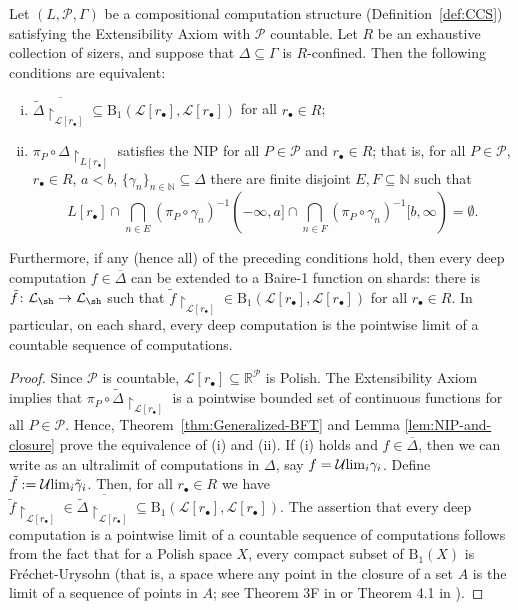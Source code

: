 \begin{theorem}\label{thm:nip-baire1def}
    Let $(L,\mathcal{P},\Gamma)$ be a compositional computation structure (Definition~\ref{def:CCS}) satisfying the Extensibility Axiom with $\mathcal{P}$ countable.
    Let $R$ be an exhaustive collection of sizers, and suppose that $\Delta\subseteq\Gamma$ is $R$-confined.
    Then the following conditions are equivalent:

    \begin{enumerate}[(i)]
        \item $\overline{\tilde\Delta\restriction_{\mathcal{L}[r_\bullet]}}\subseteq \mathrm{B}_1(\mathcal{L}[r_\bullet],\mathcal{L}[r_\bullet])$ for all $r_\bullet\in R$;
        \item $\pi_P\circ \Delta\restriction_{L[r_\bullet]}$ satisfies the NIP for all $P\in\mathcal{P}$ and $r_\bullet\in R$; that is, for all $P\in\mathcal{P}$, $r_\bullet\in R$, $a<b$, $\{\gamma_n\}_{n\in\mathbb{N}}\subseteq\Delta$ there are finite disjoint $E,F\subseteq\mathbb{N}$ such that
        \[L[r_\bullet]\cap\bigcap_{n\in E}(\pi_P\circ\gamma_n)^{-1}(-\infty,a]\cap\bigcap_{n\in F}(\pi_P\circ\gamma_n)^{-1}[b,\infty)=\emptyset.\]
    \end{enumerate}

    Furthermore, if any (hence all) of the preceding conditions hold, then every deep computation $f\in\overline{\Delta}$ can be extended to a Baire-1 function on shards: there is $\tilde f\colon\mathcal{L}_{\sh}\to \mathcal{L}_{\sh}$ such that $\tilde f\restriction_{\mathcal{L}[r_\bullet]}\in \mathrm{B}_1(\mathcal{L}[r_\bullet],\mathcal{L}[r_\bullet])$ for all $r_{\bullet}\in R$.
    In particular, on each shard, every deep computation is the pointwise limit of a countable sequence of computations.
\end{theorem}

\begin{proof}
    Since $\mathcal{P}$ is countable, $\mathcal{L}[r_\bullet]\subseteq\mathbb{R}^\mathcal{P}$ is Polish.
    The Extensibility Axiom implies that $\pi_P\circ \tilde\Delta\restriction_{\mathcal{L}[r_\bullet]}$ is a pointwise bounded set of continuous functions for all $P\in\mathcal{P}$.
    Hence, Theorem~\ref{thm:Generalized-BFT} and Lemma \ref{lem:NIP-and-closure} prove the equivalence of (i) and (ii).
    If (i) holds and $f\in\overline{\Delta}$, then we can write as an ultralimit of computations in $\Delta$, say  $f=\mathcal{U}{\rm lim}_i \gamma_i$.
    Define $\tilde f:=\mathcal{U}{\rm lim}_i \tilde\gamma_i$.
    Then, for all $r_\bullet\in R$ we have $\tilde f\restriction_{\mathcal{L}[r_\bullet]}\in\overline{\tilde\Delta\restriction_{\mathcal{L}[r_\bullet]}}\subseteq \mathrm{B}_1(\mathcal{L}[r_\bullet],\mathcal{L}[r_\bullet])$.
    The assertion that every deep computation is a pointwise limit of a countable sequence of computations follows from the fact that for a Polish space $X$, every compact subset of $\mathrm{B}_1(X)$ is Fréchet-Urysohn (that is, a space where any point in the closure of a set $A$ is the limit of a sequence of points in $A$; see Theorem 3F in \cite{BFT_1978_PCompactBaire} or Theorem 4.1 in \cite{debs2013rosenthal}).
\end{proof}

